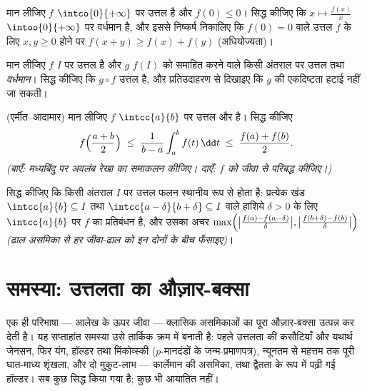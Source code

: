 \begin{exercise}[$\star\star\star$]\label{exo:b2:realfun:9}
मान लीजिए $f$ $\intco{0}{+\infty}$ पर उत्तल है और $f(0) \leq 0$। सिद्ध कीजिए कि $x \mapsto \frac{f(x)}{x}$ $\intoo{0}{+\infty}$ पर वर्धमान
है, और इससे निष्कर्ष निकालिए कि $f(0) =
0$ वाले उत्तल $f$ के लिए $x, y \geq 0$ होने पर
$f(x + y) \geq f(x) + f(y)$ (अधियोज्यता)।
\end{exercise}

\begin{exercise}[$\star$]\label{exo:b2:realfun:10}
मान लीजिए $f$ $I$ पर उत्तल है और $g$ $f(I)$ को समाहित करने वाले किसी अंतराल
पर उत्तल तथा \emph{वर्धमान}। सिद्ध कीजिए कि $g \circ f$ उत्तल है, और प्रतिउदाहरण
से दिखाइए कि $g$ की एकदिष्टता हटाई नहीं जा सकती।
\end{exercise}

\begin{exercise}[$\star\star$]\label{exo:b2:realfun:11}
(एर्मीत--आदामार) मान लीजिए $f$ $\intcc{a}{b}$ पर उत्तल और  है। सिद्ध कीजिए
\[
f\Bigl(\frac{a+b}{2}\Bigr) \;\leq\; \frac{1}{b -
a}\int_a^b f(t)\,\dd t \;\leq\; \frac{f(a) + f(b)}{2} .
\]
\emph{(बाएँ: मध्यबिंदु पर अवलंब रेखा का समाकलन कीजिए। दाएँ: $f$ को जीवा
से परिबद्ध कीजिए।)}
\end{exercise}

\begin{exercise}[$\star\star\star$]\label{exo:b2:realfun:12}
सिद्ध कीजिए कि किसी \emph{} अंतराल $I$ पर उत्तल फलन स्थानीय रूप से
 होता है: प्रत्येक खंड $\intcc{a}{b} \subseteq I$ तथा $\intcc{a - \delta}{b + \delta}
\subseteq I$ वाले हाशिये $\delta > 0$ के लिए $\intcc{a}{b}$
पर $f$ का प्रतिबंधन  है, और उसका अचर
$\max\Bigl(\bigl|\frac{f(a) - f(a - \delta)}{\delta}\bigr|,
\bigl|\frac{f(b + \delta) - f(b)}{\delta}\bigr|\Bigr)$
\emph{(ढाल असमिका से हर जीवा-ढाल को इन दोनों के बीच फँसाइए)}।
\end{exercise}

\section{समस्या: उत्तलता का औज़ार-बक्सा}

एक ही परिभाषा --- आलेख के ऊपर जीवा --- क्लासिक असमिकाओं का पूरा
औज़ार-बक्सा उत्पन्न कर देती है। यह सप्ताहांत समस्या उसे तार्किक क्रम में
बनाती है: पहले उत्तलता की कसौटियाँ और यथार्थ जेनसन, फिर यंग, हॉल्डर तथा
मिंकोव्स्की ($p$-मानदंडों के जन्म-प्रमाणपत्र), न्यूनतम से महत्तम तक पूरी
घात-माध्य शृंखला, और दो मुकुट-लाभ --- कार्लेमान की असमिका, तथा द्वैतता के
रूप में पढ़ी गई हॉल्डर। सब कुछ सिद्ध किया गया है; कुछ भी आयातित नहीं।

